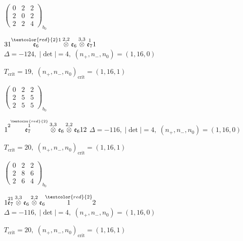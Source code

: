 \documentclass[10pt]{article}
\begin{document}
\hspace{2em}$\left(\begin{smallmatrix}0 & 2 & 2 \\ 2 & 0 & 2 \\ 2 & 2 & 4\end{smallmatrix}\right)_{\!b_0}$

\smallskip

$31\overset{\textcolor{red}{2}1}{\mathfrak{e}_6}\overset{2,2}{\otimes}\mathfrak{e}_6\overset{3,3}{\otimes}\overset{1}{\mathfrak{e}_7}1$ \quad $\Delta=-124,\; |\det|=4,\; (n_+,n_-,n_0)=(1,16,0)$

\hspace{1em}$T_{\text{crit}}=19,\; (n_+,n_-,n_0)_{\text{crit}}=(1,16,1)$

\hspace{2em}$\left(\begin{smallmatrix}0 & 2 & 2 \\ 2 & 5 & 5 \\ 2 & 5 & 5\end{smallmatrix}\right)_{\!b_0}$

\smallskip

$1\overset{2\overset{\textcolor{red}{2}}{1}}{\mathfrak{e}_7}\overset{3,3}{\otimes}\mathfrak{e}_6\overset{2,2}{\otimes}\mathfrak{e}_612$ \quad $\Delta=-116,\; |\det|=4,\; (n_+,n_-,n_0)=(1,16,0)$

\hspace{1em}$T_{\text{crit}}=20,\; (n_+,n_-,n_0)_{\text{crit}}=(1,16,1)$

\hspace{2em}$\left(\begin{smallmatrix}0 & 2 & 2 \\ 2 & 8 & 6 \\ 2 & 6 & 4\end{smallmatrix}\right)_{\!b_0}$

$1\overset{21}{\mathfrak{e}_7}\overset{3,3}{\otimes}\mathfrak{e}_6\overset{2,2}{\otimes}\mathfrak{e}_6\overset{\textcolor{red}{2}}{1}2$ \quad $\Delta=-116,\; |\det|=4,\; (n_+,n_-,n_0)=(1,16,0)$

\hspace{1em}$T_{\text{crit}}=20,\; (n_+,n_-,n_0)_{\text{crit}}=(1,16,1)$
\end{document}
